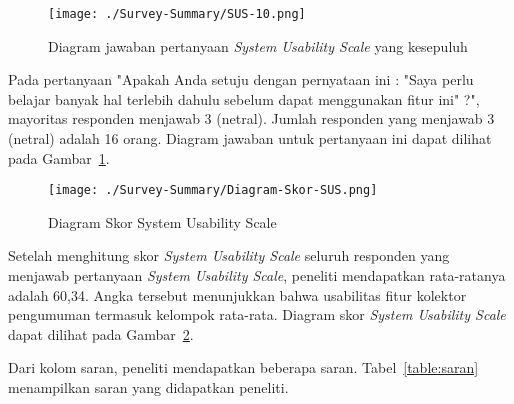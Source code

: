 \begin{figure}[H]
	\centering  
	\texttt{[image: ./Survey-Summary/SUS-10.png]}
	\caption[Diagram jawaban pertanyaan \textit{System Usability Scale} yang kesepuluh]{Diagram jawaban pertanyaan \textit{System Usability Scale} yang kesepuluh}
	\label{fig:summary-SUS-10} 
\end{figure}

Pada pertanyaan "Apakah Anda setuju dengan pernyataan ini : "Saya perlu belajar banyak hal terlebih dahulu sebelum dapat menggunakan fitur ini" ?", mayoritas responden menjawab 3 (netral). Jumlah responden yang menjawab 3 (netral) adalah 16 orang. Diagram jawaban untuk pertanyaan ini dapat dilihat pada Gambar~\ref{fig:summary-SUS-10}.

\begin{figure}[H]
	\centering  
	\texttt{[image: ./Survey-Summary/Diagram-Skor-SUS.png]}
	\caption[Diagram Skor System Usability Scale]{Diagram Skor System Usability Scale} 
	\label{fig:summary-Diagram-Skor-SUS} 
\end{figure}

Setelah menghitung skor \textit{System Usability Scale} seluruh responden yang menjawab pertanyaan \textit{System Usability Scale}, peneliti mendapatkan rata-ratanya adalah 60,34. Angka tersebut menunjukkan bahwa usabilitas fitur kolektor pengumuman termasuk kelompok rata-rata. Diagram skor \textit{System Usability Scale} dapat dilihat pada Gambar~\ref{fig:summary-Diagram-Skor-SUS}. 

Dari kolom saran, peneliti mendapatkan beberapa saran. Tabel~\ref{table:saran} menampilkan saran yang didapatkan peneliti.


